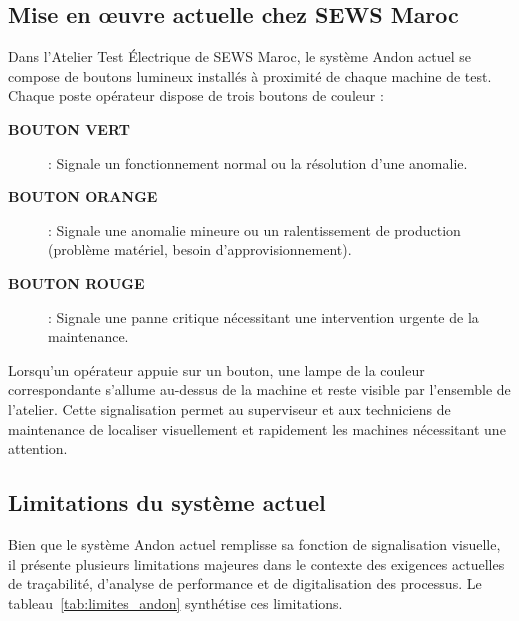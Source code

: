 \subsection{Mise en œuvre actuelle chez SEWS Maroc}

Dans l'Atelier Test Électrique de SEWS Maroc, le système Andon actuel se compose de boutons lumineux installés à proximité de chaque machine de test. Chaque poste opérateur dispose de trois boutons de couleur :

\begin{description}
    \item[\textcolor{green!70!black}{\textbf{BOUTON VERT}}] : Signale un fonctionnement normal ou la résolution d'une anomalie.
    \item[\textcolor{orange!90!black}{\textbf{BOUTON ORANGE}}] : Signale une anomalie mineure ou un ralentissement de production (problème matériel, besoin d'approvisionnement).
    \item[\textcolor{red!80!black}{\textbf{BOUTON ROUGE}}] : Signale une panne critique nécessitant une intervention urgente de la maintenance.
\end{description}

Lorsqu'un opérateur appuie sur un bouton, une lampe de la couleur correspondante s'allume au-dessus de la machine et reste visible par l'ensemble de l'atelier. Cette signalisation permet au superviseur et aux techniciens de maintenance de localiser visuellement et rapidement les machines nécessitant une attention.

\subsection{Limitations du système actuel}

Bien que le système Andon actuel remplisse sa fonction de signalisation visuelle, il présente plusieurs limitations majeures dans le contexte des exigences actuelles de traçabilité, d'analyse de performance et de digitalisation des processus. Le tableau~\ref{tab:limites_andon} synthétise ces limitations.

